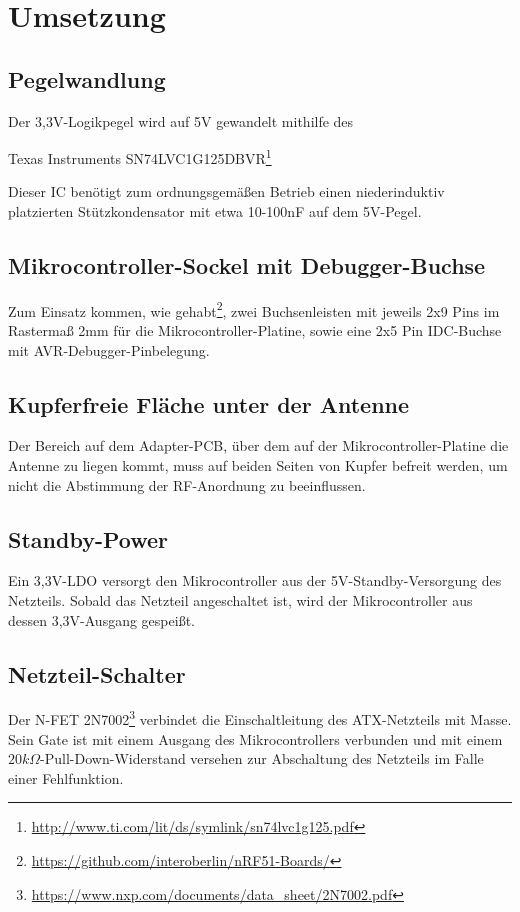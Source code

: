 
\section{Umsetzung}
\subsection{Pegelwandlung}
Der 3,3V-Logikpegel wird auf 5V gewandelt
mithilfe des
\begin{center}
	Texas Instruments SN74LVC1G125DBVR\footnote{\url{http://www.ti.com/lit/ds/symlink/sn74lvc1g125.pdf}}
\end{center}
Dieser IC ben\"otigt
zum ordnungsgem\"a{\ss}en Betrieb
einen niederinduktiv platzierten St\"utzkondensator
mit etwa 10-100nF
auf dem 5V-Pegel.

\subsection{Mikrocontroller-Sockel mit Debugger-Buchse}
Zum Einsatz kommen,
wie gehabt\footnote{\url{https://github.com/interoberlin/nRF51-Boards/}},
zwei Buchsenleisten mit jeweils 2x9 Pins im Rasterma{\ss} 2mm
f\"ur die Mikrocontroller-Platine,
sowie eine 2x5 Pin IDC-Buchse
mit AVR-Debugger-Pinbelegung.

\subsection{Kupferfreie Fl\"ache unter der Antenne}
Der Bereich auf dem Adapter-PCB,
\"uber dem auf der Mikrocontroller-Platine die Antenne zu liegen kommt,
muss auf beiden Seiten von Kupfer befreit werden,
um nicht die Abstimmung der RF-Anordnung zu beeinflussen.

\subsection{Standby-Power}
Ein 3,3V-LDO versorgt den Mikrocontroller
aus der 5V-Standby-Versorgung des Netzteils.
Sobald das Netzteil angeschaltet ist,
wird der Mikrocontroller
aus dessen 3,3V-Ausgang gespei{\ss}t.

\subsection{Netzteil-Schalter}
Der N-FET 2N7002\footnote{\url{https://www.nxp.com/documents/data_sheet/2N7002.pdf}}
verbindet die Einschaltleitung des ATX-Netzteils
mit Masse.
Sein Gate
ist mit einem Ausgang
des Mikrocontrollers
verbunden
und mit einem $20k\Omega$-Pull-Down-Widerstand versehen
zur Abschaltung des Netzteils
im Falle einer Fehlfunktion.


